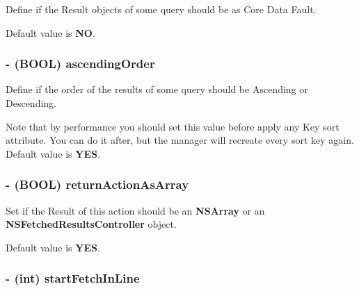 Define if the Result objects of some query should be as Core Data Fault. 

Default value is {\bfseries NO}. \hypertarget{interface_j_p_d_b_manager_action_a0e153817018f1c41c7fa6bd5780ef09a}{
\subsubsection[{ascendingOrder}]{\setlength{\rightskip}{0pt plus 5cm}-\/ (BOOL) ascendingOrder}}
\label{interface_j_p_d_b_manager_action_a0e153817018f1c41c7fa6bd5780ef09a}


Define if the order of the results of some query should be Ascending or Descending. 

Note that by performance you should set this value before apply any Key sort attribute. You can do it after, but the manager will recreate every sort key again. Default value is {\bfseries YES}. \hypertarget{interface_j_p_d_b_manager_action_aecdffb5193789cbd3e4704e71c90972c}{
\subsubsection[{returnActionAsArray}]{\setlength{\rightskip}{0pt plus 5cm}-\/ (BOOL) returnActionAsArray}}
\label{interface_j_p_d_b_manager_action_aecdffb5193789cbd3e4704e71c90972c}


Set if the Result of this action should be an {\bfseries NSArray} or an {\bfseries NSFetchedResultsController} object. 

\par
 Default value is {\bfseries YES}. \hypertarget{interface_j_p_d_b_manager_action_ad679e0229dbddd7d5c87a6348d33fc9e}{
\subsubsection[{startFetchInLine}]{\setlength{\rightskip}{0pt plus 5cm}-\/ (int) startFetchInLine}}
\label{interface_j_p_d_b_manager_action_ad679e0229dbddd7d5c87a6348d33fc9e}



